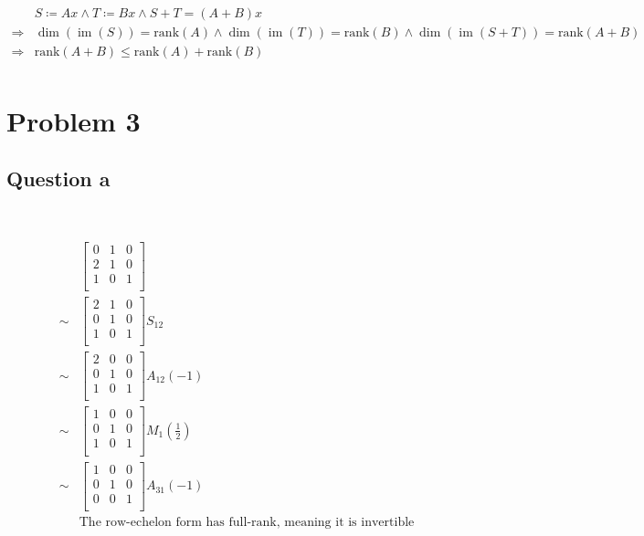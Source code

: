 \documentclass{article}
\def\rank{\text{rank}}
\DeclareMathOperator{\im}{im}
\begin{document}
~

\begin{equation*}
\begin{split}
&S\coloneqq Ax\land T\coloneqq Bx\land S+T=(A+B)x\\
\Rightarrow &\dim(\im(S))=\rank(A)\land\dim(\im(T))=\rank(B)\land\dim(\im(S+T))=\rank(A+B)\\
\Rightarrow &\rank(A+B)\leq\rank(A)+\rank(B)\\
\end{split}
\end{equation*}

\newpage

\section{Problem 3}

\subsection{Question a}

~

\begin{equation*}
\begin{split}
&\begin{bmatrix}
0&1&0\\
2&1&0\\
1&0&1\\
\end{bmatrix}\\
\sim&\begin{bmatrix}
2&1&0\\
0&1&0\\
1&0&1\\
\end{bmatrix} S_{12}\\
\sim&\begin{bmatrix}
2&0&0\\
0&1&0\\
1&0&1\\
\end{bmatrix} A_{12}(-1)\\
\sim&\begin{bmatrix}
1&0&0\\
0&1&0\\
1&0&1\\
\end{bmatrix} M_{1}(\frac{1}{2})\\
\sim&\begin{bmatrix}
1&0&0\\
0&1&0\\
0&0&1\\
\end{bmatrix} A_{31}(-1)\\
&\text{The row-echelon form has full-rank, meaning it is invertible}\\
\end{split}
\end{equation*}
\end{document}

